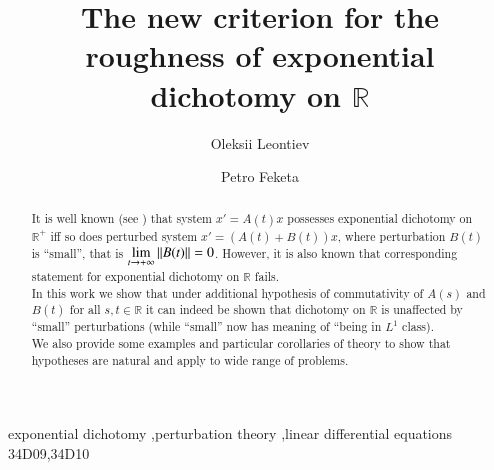 \documentclass{elsarticle}
\theoremstyle{remark}
\begin{document}
\begin{frontmatter}

\title{The new criterion for the roughness of exponential dichotomy on $\mathbb{R}$}

\author[todai]{Oleksii Leontiev}
\author[erfurt]{Petro Feketa}


\address[todai]{The University of Tokyo}
\address[erfurt]{Erfurt University of Applied Sciences}

\begin{abstract}
	It is well known (see \cite{coppel1978dichotomies})
	that system $x'=A(t)x$ possesses exponential dichotomy on $\mathbb{R}^+$ iff so does perturbed system
	$x'=(A(t)+B(t))x$, where perturbation $B(t)$ is ``small'', that is $\lim_{t\to+\infty}\mynorm{B(t)}=0$. However, it is also
	known that corresponding statement for exponential dichotomy on $\mathbb{R}$ fails.\\
	In this work we show that under additional hypothesis of commutativity of $A(s)$ and $B(t)$ for all $s,t\in\mathbb{R}$
	it can indeed be shown that dichotomy on $\mathbb{R}$ is unaffected by ``small'' perturbations (while ``small'' now
	has meaning of ``being in $L^1$ class).\\
	We also provide some examples and particular corollaries of theory to show that hypotheses are natural and apply to wide
	range of problems.
\end{abstract}

\begin{keyword}
exponential dichotomy \sep perturbation theory \sep linear differential equations
\MSC[2010] 34D09\sep 34D10
\end{keyword}

\end{frontmatter}

\linenumbers
\end{document}
